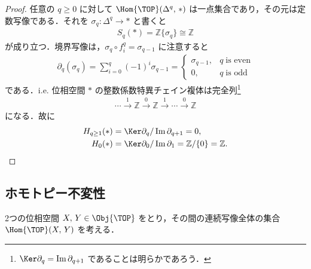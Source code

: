 \documentclass[algtopo_main]{subfiles}
\begin{document}
\begin{proof}
    任意の $q \ge 0$ に対して $\Hom{\TOP}(\Delta^q,\, *)$ は一点集合であり，その元は定数写像である．それを $\sigma_q \colon \Delta^q \to *$ と書くと
    \begin{align}
        S_q(*) = \mathbb{Z} \{\sigma_q\} \cong \mathbb{Z}
    \end{align}
    が成り立つ．境界写像は，$\sigma_q \circ f^q_i = \sigma_{q-1}$ に注意すると
    \begin{align}
        \partial_q(\sigma_q) = \sum_{i=0}^q (-1)^i \sigma_{q-1} =
        \begin{cases}
            \sigma_{q-1}, &q\; \text{is even} \\
            0, &q\; \text{is odd}
        \end{cases}
    \end{align}
    である．i.e. 位相空間 $*$ の整数係数特異チェイン複体は完全列\footnote{$\Ker\partial_q = \Im\partial_{q+1}$ であることは明らかであろう．}
    \begin{align}
        \cdots \xrightarrow{1} \mathbb{Z} \xrightarrow{0} \mathbb{Z} \xrightarrow{1} \cdots \xrightarrow{0} \mathbb{Z}
    \end{align}
    になる．故に
    \begin{align}
        H_{q \ge 1}(*) &= \Ker \partial_q / \Im \partial_{q+1} = 0, \\
        H_0(*) &= \Ker \partial_0/\Im\partial_1 = \mathbb{Z} / \{0\} = \mathbb{Z}.
    \end{align}
\end{proof}

\subsection{ホモトピー不変性}

2つの位相空間 $X,\, Y \in \Obj{\TOP}$ をとり，その間の連続写像全体の集合 $\Hom{\TOP}(X,\, Y)$ を考える．
\end{document}
